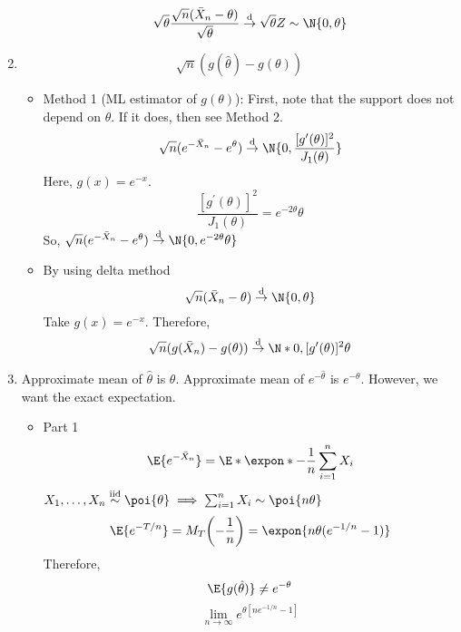 \begin{Example}{}{}
\begin{enumerate}[label=(\roman*)]
\begin{itemize}
                        \[ \sqrt{\theta}\frac{\sqrt{n}(\bar{X}_n-\theta)}{\sqrt{\theta}}
                            \stackrel{\text{d}}{\to}\sqrt{\theta}Z \sim \N{0,\theta} \]
              \end{itemize}
        \item \[ \sqrt{n}(g(\hat{\theta})-g(\theta)) \]
              \begin{itemize}
                  \item Method 1 (ML estimator of $ g(\theta) $):
                        First, note that
                        the support does not depend on $ \theta $. If it does,
                        then see Method 2.
                        \[ \sqrt{n}(e^{-\bar{X}_n}-e^\theta)
                            \stackrel{\text{d}}{\to}\N{0,\frac{[g^\prime(\theta)]^2}{J_1(\theta)} } \]
                        Here, $ g(x)=e^{-x} $.
                        \[ \frac{[g^\prime(\theta)]^2}{J_1(\theta)}=e^{-2\theta}\theta  \]
                        So, $ \sqrt{n}(e^{-\bar{X}_n}-e^\theta)
                            \stackrel{\text{d}}{\to}\N{0,e^{-2\theta}\theta} $
                  \item By using delta method
                        \[ \sqrt{n}(\bar{X}_n-\theta) \stackrel{\text{d}}{\to}\N{0,\theta} \]
                        Take $ g(x)=e^{-x} $. Therefore,
                        \[ \sqrt{n}(g(\bar{X}_n)-g(\theta)) \stackrel{\text{d}}{\to}
                            \N*{0,[g^\prime(\theta)]^2\theta} \]
              \end{itemize}
        \item Approximate mean of $ \hat{\theta} $ is $ \theta $.
              Approximate mean of $ e^{-\hat{\theta}} $ is $ e^{-\theta} $.
              However, we want the exact expectation.
              \begin{itemize}
                  \item Part 1
                        \[ \E{e^{-\bar{X}_n}}=\E*{
                                \expon*{-\frac{1}{n} \sum_{i=1}^{n} X_i}
                            } \]
                        $ X_1,\ldots,X_n \stackrel{\text{iid}}{\sim}\poi{\theta}
                            \implies \sum_{i=1}^{n} X_i \sim \poi{n\theta} $
                        \[ \E{e^{-T/n}}=
                            M_T\biggl(-\frac{1}{n} \biggr)=
                            \expon{n\theta(e^{-1/n}-1)} \]
                        Therefore,
                        \[ \E{g(\hat{\theta})}\neq e^{-\theta} \]
                        \[ \lim\limits_{{n} \to {\infty}}
                            e^{\theta[ne^{-1/n}-1]} \]

\end{itemize}
\end{enumerate}
\end{Example}
